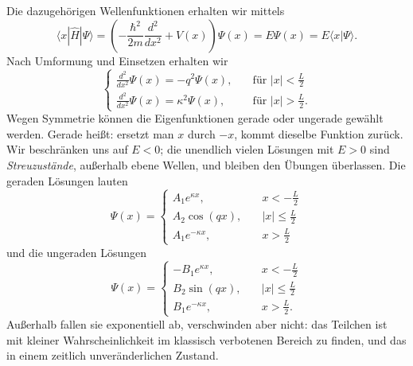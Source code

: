 Die dazugehörigen Wellenfunktionen erhalten wir mittels
\begin{equation}
	\langle x|\widehat{H}|\Psi\rangle = \left(-\frac{\hbar^2}{2m}\frac{d^2}{dx^2} + V(x)\right)\Psi(x) = E\Psi(x) = E\langle x|\Psi\rangle.
\end{equation}
Nach Umformung und Einsetzen erhalten wir
\begin{equation}
	\begin{cases}
		\frac{d^2}{dx^2}\Psi(x) = -q^2 \Psi(x), \quad &\text{für $|x|<\frac{L}{2}$}\\
		\frac{d^2}{dx^2}\Psi(x) = \kappa^2 \Psi(x), \quad &\text{für $|x|>\frac{L}{2}$}.
	\end{cases}
\end{equation}
Wegen Symmetrie können die Eigenfunktionen gerade oder ungerade gewählt werden. Gerade heißt: ersetzt man $x$ durch $-x$, kommt dieselbe Funktion zurück. Wir beschränken uns auf $E<0$; die unendlich vielen Lösungen mit $E>0$ sind \emph{Streuzustände}, außerhalb ebene Wellen, und bleiben den Übungen überlassen. Die geraden Lösungen lauten
\begin{equation}
	\Psi(x) = \begin{cases}
		A_1 e^{\kappa x}, \quad & x< -\frac{L}{2} \\
		A_2 \cos(qx), \quad & |x| \le \frac{L}{2} \\
		A_1 e^{-\kappa x}, \quad & x> \frac{L}{2}
	\end{cases}
\end{equation}
und die ungeraden Lösungen
\begin{equation}
	\Psi(x) = \begin{cases}
		-B_1 e^{\kappa x}, \quad & x< -\frac{L}{2} \\
		B_2 \sin(qx), \quad & |x| \le \frac{L}{2} \\
		B_1 e^{-\kappa x}, \quad & x> \frac{L}{2}.
	\end{cases}
\end{equation}
Außerhalb fallen sie exponentiell ab, verschwinden aber nicht: das Teilchen ist mit kleiner Wahrscheinlichkeit im klassisch verbotenen Bereich zu finden, und das in einem zeitlich unveränderlichen Zustand.

